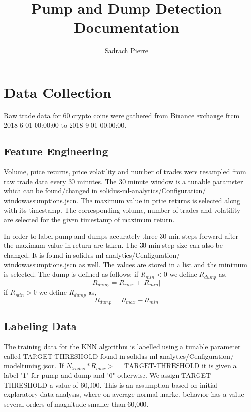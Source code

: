 \documentclass[12pt]{article}
\title{Pump and Dump Detection Documentation}
\author{Sadrach Pierre}
\begin{document}
\maketitle

\section{Data Collection}
Raw trade data for 60 crypto coins were gathered from Binance exchange from 2018-6-01 00:00:00 to 2018-9-01 00:00:00. 

\subsection{Feature Engineering}
Volume, price returns, price volatility and number of trades were resampled from raw trade data every 30 minutes. The 30 minute window is a tunable parameter which can be found/changed in solidus-ml-analytics/Configuration/ windowassumptions.json. The maximum value in price returns is selected along with its timestamp. The corresponding volume, number of trades and volatility are selected for the given timestamp of maximum return. 

In order to label pump and dumps accurately three 30 min steps forward after the maximum value in return are taken. The 30 min step size can also be changed. It is found in solidus-ml-analytics/Configuration/ windowassumptions.json as well. The values are stored in a list and the minimum is selected. The dump is defined as follows:
if $R_{min} < 0$ we define $R_{dump}$ as,
\begin{equation}
R_{dump} = R_{max} + |R_{min}|
\end{equation}
if $R_{min} >0$ we define $R_{dump}$ as,
\begin{equation}
R_{dump} = R_{max} - R_{min}
\end{equation}
\subsection{Labeling Data}
The training data for the KNN algorithm is labelled using a tunable parameter called TARGET-THRESHOLD found in solidus-ml-analytics/Configuration/ modeltuning.json.  If $N_{trades}*R_{max}>= \textrm{TARGET-THRESHOLD}$ it is given a label "1" for pump and dump and "0" otherwise. We assign TARGET-THRESHOLD a value of 60,000. This is an assumption based on initial exploratory data analysis, where on average normal market behavior has a value several orders of magnitude smaller than 60,000. 
\end{document}
